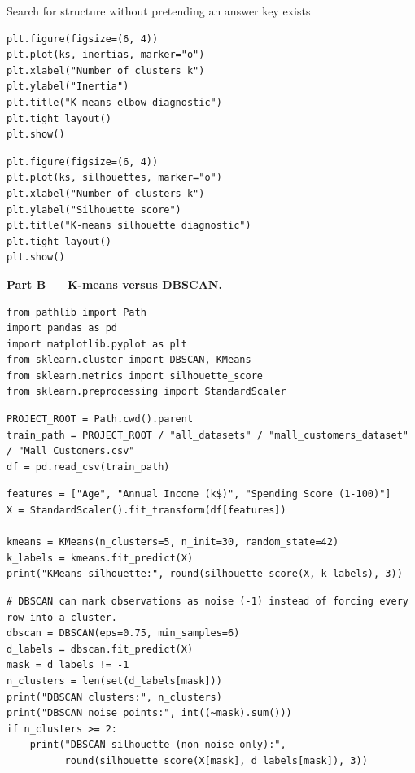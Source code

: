\begin{labproject}{Search for structure without pretending an answer key exists}
\begin{lstlisting}[style=mlpython]
plt.figure(figsize=(6, 4))
plt.plot(ks, inertias, marker="o")
plt.xlabel("Number of clusters k")
plt.ylabel("Inertia")
plt.title("K-means elbow diagnostic")
plt.tight_layout()
plt.show()
\end{lstlisting}

\begin{lstlisting}[style=mlpython]
plt.figure(figsize=(6, 4))
plt.plot(ks, silhouettes, marker="o")
plt.xlabel("Number of clusters k")
plt.ylabel("Silhouette score")
plt.title("K-means silhouette diagnostic")
plt.tight_layout()
plt.show()
\end{lstlisting}

\medskip\noindent\textbf{Part B --- K-means versus DBSCAN.}\par
\begin{lstlisting}[style=mlpython]
from pathlib import Path
import pandas as pd
import matplotlib.pyplot as plt
from sklearn.cluster import DBSCAN, KMeans
from sklearn.metrics import silhouette_score
from sklearn.preprocessing import StandardScaler
\end{lstlisting}

\begin{lstlisting}[style=mlpython]
PROJECT_ROOT = Path.cwd().parent
train_path = PROJECT_ROOT / "all_datasets" / "mall_customers_dataset" / "Mall_Customers.csv"
df = pd.read_csv(train_path)
\end{lstlisting}

\begin{lstlisting}[style=mlpython]
features = ["Age", "Annual Income (k$)", "Spending Score (1-100)"]
X = StandardScaler().fit_transform(df[features])

kmeans = KMeans(n_clusters=5, n_init=30, random_state=42)
k_labels = kmeans.fit_predict(X)
print("KMeans silhouette:", round(silhouette_score(X, k_labels), 3))
\end{lstlisting}

\begin{lstlisting}[style=mlpython]
# DBSCAN can mark observations as noise (-1) instead of forcing every row into a cluster.
dbscan = DBSCAN(eps=0.75, min_samples=6)
d_labels = dbscan.fit_predict(X)
mask = d_labels != -1
n_clusters = len(set(d_labels[mask]))
print("DBSCAN clusters:", n_clusters)
print("DBSCAN noise points:", int((~mask).sum()))
if n_clusters >= 2:
    print("DBSCAN silhouette (non-noise only):",
          round(silhouette_score(X[mask], d_labels[mask]), 3))
\end{lstlisting}


\end{labproject}

